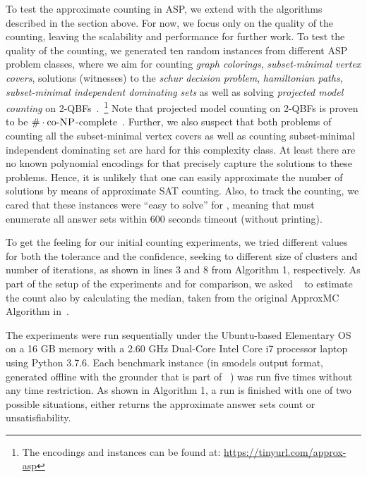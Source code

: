 To test the approximate counting in ASP, we extend \xorro{} with the algorithms described in the section above.
For now, we focus only on the quality of the counting, leaving the scalability and performance for further work.
%
To test the quality of the counting,
we generated ten random instances from different ASP problem classes, where we aim for counting \emph{graph colorings}, \emph{subset-minimal vertex covers}, solutions (witnesses) to the \emph{schur decision problem}, \emph{hamiltonian paths}, \emph{subset-minimal independent dominating sets} as well as solving \emph{projected model counting} on 2-QBFs~\cite{DurandHermannKolaitis05,KleineBuningLettman99}.~\footnote{The encodings and instances can be found at: \url{https://tinyurl.com/approx-asp}}
Note that projected model counting on 2-QBFs is proven to be $\#\cdot\text{co-}\textsc{NP}$-complete~\cite{DurandHermannKolaitis05}. Further, we also suspect that both problems of counting all the subset-minimal vertex covers as well as counting subset-minimal independent dominating set are hard for this complexity class. At least there are no known polynomial encodings for \SAT that precisely capture the solutions to these problems. Hence, it is unlikely that one can easily approximate the number of solutions by means of approximate SAT counting.
Also, to track the counting, we cared that these instances were ``easy to solve'' for \clingo{},
meaning that \clingo{} must enumerate all answer sets within 600 seconds timeout (without printing).

To get the feeling for our initial counting experiments, we tried different values for both the tolerance and the confidence, seeking to different size of clusters and number of iterations,
as shown in lines 3 and 8 from Algorithm 1, respectively.
As part of the setup of the experiments and for comparison, we asked \xorro{}~\cite{DBLP:conf/lpnmr/EverardoJKS19}  to estimate the count also by calculating the median, taken from the original ApproxMC Algorithm in~\cite{ChakrabortyMV13}.

The experiments were run sequentially under the Ubuntu-based Elementary OS on a 16 GB memory with a 2.60 GHz Dual-Core Intel Core i7 processor laptop using Python 3.7.6.
Each benchmark instance (in smodels output format, generated offline with the grounder \gringo{} that is part of \clingo{}~\cite{DBLP:conf/iclp/GebserKKOSW16}) was run five times without any time restriction. 
As shown in Algorithm 1, a run is finished with one of two possible situations, either \xorro{} returns the approximate answer sets count or unsatisfiability.

